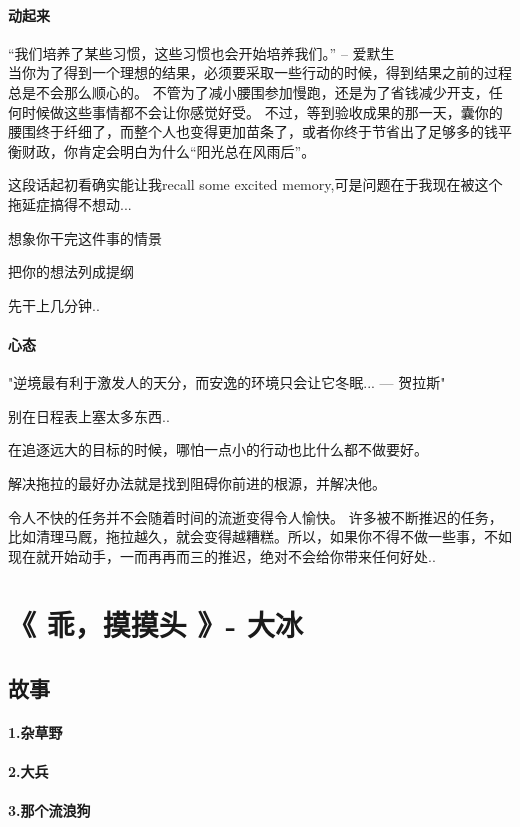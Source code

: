\documentclass[UTF8,a4paper,8pt]{ctexart}
\begin{document}
 \paragraph{动起来}“我们培养了某些习惯，这些习惯也会开始培养我们。” -- 爱默生
 \\
 
 当你为了得到一个理想的结果，必须要采取一些行动的时候，得到结果之前的过程总是不会那么顺心的。 不管为了减小腰围参加慢跑，还是为了省钱减少开支，任何时候做这些事情都不会让你感觉好受。
 不过，等到验收成果的那一天，囊你的腰围终于纤细了，而整个人也变得更加苗条了，或者你终于节省出了足够多的钱平衡财政，你肯定会明白为什么“阳光总在风雨后”。
 
 这段话起初看确实能让我recall some excited memory,可是问题在于我现在被这个拖延症搞得不想动...
 
 
 想象你干完这件事的情景
 
 把你的想法列成提纲
 
 先干上几分钟..
 
 \paragraph{心态} "逆境最有利于激发人的天分，而安逸的环境只会让它冬眠... --- 贺拉斯"
 
 别在日程表上塞太多东西..
 
 在追逐远大的目标的时候，哪怕一点小的行动也比什么都不做要好。
 
 解决拖拉的最好办法就是找到阻碍你前进的根源，并解决他。
 
 令人不快的任务并不会随着时间的流逝变得令人愉快。 许多被不断推迟的任务，比如清理马厩，拖拉越久，就会变得越糟糕。所以，如果你不得不做一些事，不如现在就开始动手，一而再再而三的推迟，绝对不会给你带来任何好处..
 
 \newpage			
 \section{《 乖，摸摸头 》- 大冰 }
 \subsection{故事}
 \paragraph{1.杂草野}
 \paragraph{2.大兵}
 \paragraph{3.那个流浪狗}
\end{document}
